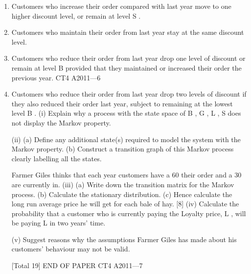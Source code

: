 \documentclass[a4paper,12pt]{article}
\begin{document}
\begin{enumerate}[1]
[Total 14]
Farmer Giles makes hay each year and he makes far more than he could possibly store
and use himself, but he does not always sell it all. He has decided to offer incentives
for people to buy large quantities so it does not sit in his field deteriorating. He has
devised the following “discount” scheme.
He has a Base price, B of £8 per bale. Then he has three levels of discount: Good
price, G , is a 10%
25%
\item Customers who increase their order compared with last year move to one higher
discount level, or remain at level S .
\item Customers who maintain their order from last year stay at the same discount level.
\item Customers who reduce their order from last year drop one level of discount or
remain at level B provided that they maintained or increased their order the
previous year.
CT4 A2011—6\item
Customers who reduce their order from last year drop two levels of discount if
they also reduced their order last year, subject to remaining at the lowest level B .
(i) Explain why a process with the state space of { B , G , L , S } does not display the
Markov property.

(ii) (a)
Define any additional state(s) required to model the system
with the Markov property.
(b)
Construct a transition graph of this Markov process clearly labelling
all the states.

Farmer Giles thinks that each year customers have a 60%
their order and a 30%
are currently in.
(iii)
(a) Write down the transition matrix for the Markov process.
(b) Calculate the stationary distribution.
(c) Hence calculate the long run average price he will get for each bale of
hay.
[8]
(iv) Calculate the probability that a customer who is currently paying the Loyalty
price, L , will be paying L in two years’ time.

(v) Suggest reasons why the assumptions Farmer Giles has made about his
customers’ behaviour may not be valid.

[Total 19]
END OF PAPER
CT4 A2011—7


\end{enumerate}
\end{document}
